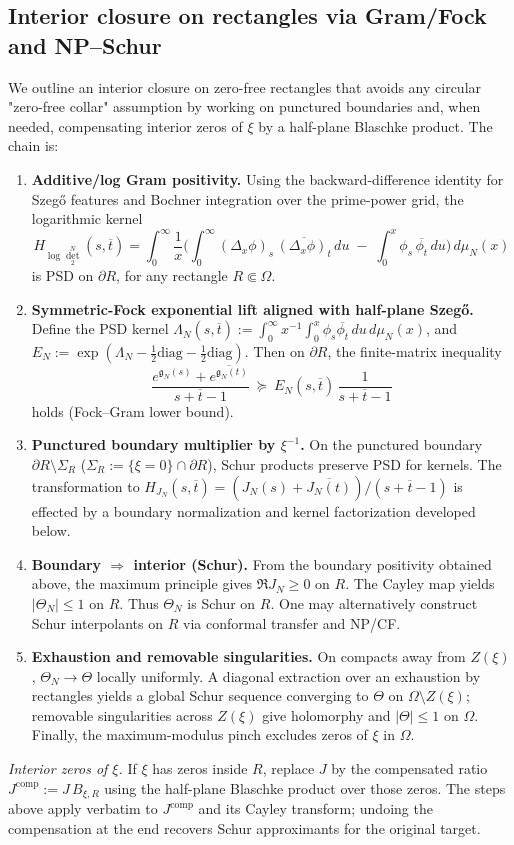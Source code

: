 \documentclass[11pt]{article}
\theoremstyle{remark}
\begin{document}
\subsection*{Interior closure on rectangles via Gram/Fock and NP--Schur}
We outline an interior closure on zero-free rectangles that avoids any circular "zero-free collar" assumption by working on punctured boundaries and, when needed, compensating interior zeros of \(\xi\) by a half-plane Blaschke product. The chain is:
\begin{enumerate}
  \item \textbf{Additive/log Gram positivity.} Using the backward-difference identity for Szeg\H{o} features and Bochner integration over the prime-power grid, the logarithmic kernel
  \[
    H_{\log\det_2^N}(s,\overline t)
    = \int_0^\infty \frac{1}{x}\Big(\int_0^\infty (\Delta_x\phi)_s\,\overline{(\Delta_x\phi)_t}\,du\; -\; \int_0^x \phi_s\,\overline{\phi_t}\,du\Big)\,d\mu_N(x)
  \]
  is PSD on \(\partial R\), for any rectangle \(R\Subset\Omega\).
  \item \textbf{Symmetric-Fock exponential lift aligned with half-plane Szeg\H{o}.} Define the PSD kernel
  \(\Lambda_N(s,\overline t):=\int_0^\infty x^{-1}\int_0^x \phi_s\overline{\phi_t}\,du\,d\mu_N(x)\), and
  \(E_N:=\exp(\Lambda_N-\tfrac12\mathrm{diag}-\tfrac12\mathrm{diag})\).
  Then on \(\partial R\), the finite-matrix inequality
  \[
    \frac{e^{\mathfrak g_N(s)}+\overline{e^{\mathfrak g_N(t)}}}{s+\overline t-1}\ \succeq\ E_N(s,\overline t)\,\frac{1}{s+\overline t-1}
  \]
  holds (Fock--Gram lower bound).
  \item \textbf{Punctured boundary multiplier by \(\xi^{-1}\).} On the punctured boundary \(\partial R\setminus\Sigma_R\) (\(\Sigma_R:=\{\xi=0\}\cap\partial R\)), Schur products preserve PSD for kernels. The transformation to \(H_{J_N}(s,\overline t)=(J_N(s)+\overline{J_N(t)})/(s+\overline t-1)\) is effected by a boundary normalization and kernel factorization developed below.
  \item \textbf{Boundary \(\Rightarrow\) interior (Schur).} From the boundary positivity obtained above, the maximum principle gives \(\Re J_N\ge 0\) on \(R\). The Cayley map yields \(|\Theta_N|\le 1\) on \(R\). Thus \(\Theta_N\) is Schur on \(R\). One may alternatively construct Schur interpolants on \(R\) via conformal transfer and NP/CF.
  \item \textbf{Exhaustion and removable singularities.} On compacts away from \(Z(\xi)\), \(\Theta_N\to\Theta\) locally uniformly. A diagonal extraction over an exhaustion by rectangles yields a global Schur sequence converging to \(\Theta\) on \(\Omega\setminus Z(\xi)\); removable singularities across \(Z(\xi)\) give holomorphy and \(|\Theta|\le 1\) on \(\Omega\). Finally, the maximum-modulus pinch excludes zeros of \(\xi\) in \(\Omega\).
\end{enumerate}
\noindent
\emph{Interior zeros of \(\xi\).} If \(\xi\) has zeros inside \(R\), replace \(J\) by the compensated ratio \(J^{\mathrm{comp}}:=J\,B_{\xi,R}\) using the half-plane Blaschke product over those zeros. The steps above apply verbatim to \(J^{\mathrm{comp}}\) and its Cayley transform; undoing the compensation at the end recovers Schur approximants for the original target.
\end{document}
